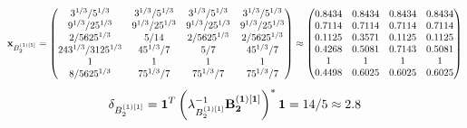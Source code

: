 \documentclass[10pt,a4paper]{article}
\begin{document}
	\[
		\bold{x}_{B_2^{(1)[1]}} = 
		\begin{pmatrix}
			{{3^ {1 / 3}}} / {{5^ {1 / 3}}} & {{3^ {1 / 3}}} / {{5^ {1 / 3}}} & {{3^ {1 / 3}}} / {{5^ {1 / 3}}} & {{3^ {1 / 3}}} / {{5^ {1 / 3}}} \\
			{{9^ {1 / 3}}} / {{25^ {1 / 3}}} & {{9^ {1 / 3}}} / {{25^ {1 / 3}}} & {{9^ {1 / 3}}} / {{25^ {1 / 3}}} & {{9^ {1 / 3}}} / {{25^ {1 / 3}}} \\
			{{2}} / {{5625^ {1 / 3}}} & {{5}} / {{14}} & {{2}} / {{5625^ {1 / 3}}} & {{2}} / {{5625^ {1 / 3}}} \\
			{{243^ {1 / 3}}} / {{3125^ {1 / 3}}} & {{45^ {1 / 3}}} / {{7}} & {{5}} / {{7}} & {{45^ {1 / 3}}} / {{7}} \\
			{1}{} & {1}{} & {1}{} & {1}{} \\
			{{8}} / {{5625^ {1 / 3}}} & {{75^ {1 / 3}}} / {{7}} & {{75^ {1 / 3}}} / {{7}} & {{75^ {1 / 3}}} / {{7}} \\
		\end{pmatrix}
		\approx
		\begin{pmatrix}
			0.8434   & 0.8434   & 0.8434   & 0.8434   \\
			0.7114   & 0.7114   & 0.7114   & 0.7114   \\
			0.1125   & 0.3571   & 0.1125   & 0.1125   \\
			0.4268   & 0.5081   & 0.7143   & 0.5081   \\
			1        & 1        & 1        & 1        \\
			0.4498   & 0.6025   & 0.6025   & 0.6025   \\
		\end{pmatrix}
	\]
	\[
		\delta_{B_2^{(1)[1]}} = \bold{1}^T \left(\lambda_{B_2^{(1)[1]}}^{-1}\bold{B_2^{(1)[1]}}\right)^* \bold{1} = {{14}} / {{5}}\approx 2.8
	\]
\end{document}
